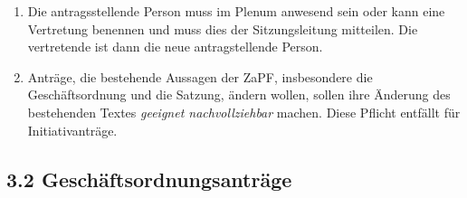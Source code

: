 \documentclass[12pt,oneside]{scrartcl}
\begin{document}
\begin{enumerate}
\item Die antragsstellende Person muss im Plenum anwesend sein
oder kann eine Vertretung benennen und muss dies
der Sitzungsleitung mitteilen.
Die vertretende ist dann die neue antragstellende Person.

\item Anträge, die bestehende Aussagen der ZaPF, insbesondere die Geschäftsordnung
und die Satzung, ändern wollen, sollen ihre Änderung des bestehenden Textes
\emph{geeignet nachvollziehbar} machen.
Diese Pflicht entfällt für Initiativanträge.
\end{enumerate}


\subsection{3.2 Geschäftsordnungsanträge%
  \label{geschaftsordnungsantrage}%
}
\end{document}
